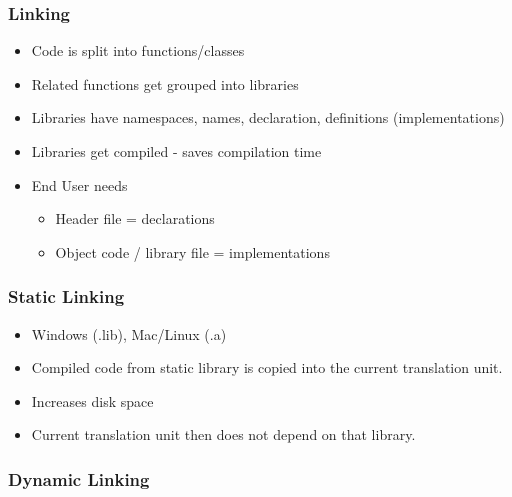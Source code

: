 \subsubsection{Linking}\label{linking}

\begin{itemize}
\itemsep1pt\parskip0pt
\item
  Code is split into functions/classes
\item
  Related functions get grouped into libraries
\item
  Libraries have namespaces, names, declaration, definitions
  (implementations)
\item
  Libraries get compiled - saves compilation time
\item
  End User needs

  \begin{itemize}
  \itemsep1pt\parskip0pt
  \item
    Header file = declarations
  \item
    Object code / library file = implementations
  \end{itemize}
\end{itemize}

\subsubsection{Static Linking}\label{static-linking}

\begin{itemize}
\itemsep1pt\parskip0pt
\item
  Windows (.lib), Mac/Linux (.a)
\item
  Compiled code from static library is copied into the current
  translation unit.
\item
  Increases disk space
\item
  Current translation unit then does not depend on that library.
\end{itemize}

\subsubsection{Dynamic Linking}\label{dynamic-linking}

